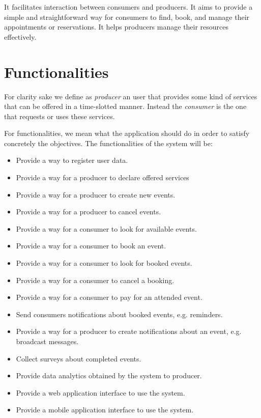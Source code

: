 \documentclass{article}
\begin{document}
It facilitates interaction between consumers and producers. It aims to provide
a simple and straightforward way for consumers to find, book, and manage their
appointments or reservations. It helps producers manage their resources
effectively.

\section{Functionalities}

For clarity sake we define as \emph{producer} an user that provides some
kind of services that can be offered in a time-slotted manner. Instead the
\emph{consumer} is the one that requests or uses these services.

For functionalities, we mean what the application should do in order to satisfy
concretely the objectives. The functionalities of the system will be:
\begin{itemize}
    \item Provide a way to register user data.
    \item Provide a way for a producer to declare offered services
    \item Provide a way for a producer to create new events.
    \item Provide a way for a producer to cancel events.
    \item Provide a way for a consumer to look for available events.
    \item Provide a way for a consumer to book an event.
    \item Provide a way for a consumer to look for booked events.
    \item Provide a way for a consumer to cancel a booking.
    \item Provide a way for a consumer to pay for an attended event.
    \item Send consumers notifications about booked events, e.g. reminders.
    \item Provide a way for a producer to create notifications about an event,
	e.g. broadcast messages. 
    \item Collect surveys about completed events.
    \item Provide data analytics obtained by the system to producer.
    \item Provide a web application interface to use the system.
    \item Provide a mobile application interface to use the system.
\end{itemize}
\end{document}

